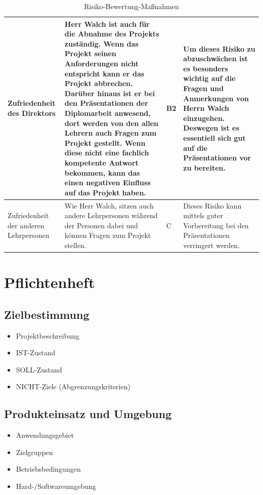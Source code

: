 \begin{table}[H]
	\centering	
		\renewcommand{\arraystretch}{1.5}
	\begin{tabular}{|p{3cm}|p{5cm}|p{2cm}|p{5cm}|}
		\hline
		Zufriedenheit des Direktors & Herr Walch ist auch für die Abnahme des Projekts zuständig. Wenn das Projekt seinen Anforderungen nicht entspricht kann er das Projekt abbrechen. Darüber hinaus  ist er bei den Präsentationen der Diplomarbeit anwesend, dort werden von den allen Lehrern auch Fragen zum Projekt gestellt. Wenn diese nicht eine fachlich kompetente Antwort bekommen, kann das einen negativen Einfluss auf das Projekt haben. & B2 & Um dieses Risiko zu abzuschwächen ist es besonders wichtig auf die Fragen und Anmerkungen von Herrn Walch einzugehen. Deswegen ist es essentiell sich gut auf die Präsentationen vor zu bereiten.\\
		\hline
		Zufriedenheit der anderen Lehrpersonen & Wie Herr Walch, sitzen auch andere Lehrpersonen während der Personen dabei und können Fragen zum Projekt stellen. & C & Dieses Risiko kann mittels guter Vorbereitung bei den Präsentationen verringert werden. \\
		\hline
	\end{tabular}
		\caption{Risiko-Bewertung-Maßnahmen}
\label{Risiko}
\end{table}
\section{Pflichtenheft}
\subsection{Zielbestimmung}
\begin{itemize}
	\item Projektbeschreibung
	\item IST-Zustand
	\item SOLL-Zustand
	\item NICHT-Ziele (Abgrenzungskriterien)
\end{itemize}
\subsection{Produkteinsatz und Umgebung}
\begin{itemize}
	\item Anwendungsgebiet
	\item Zielgruppen
	\item Betriebsbedingungen
	\item Hard-/Softwareumgebung
\end{itemize}
